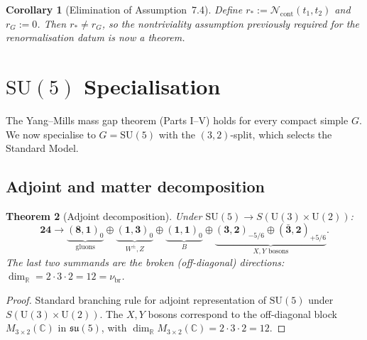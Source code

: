 \documentclass[12pt]{article}
\theoremstyle{plain}
\newtheorem{theorem}{Theorem}[section]
\newtheorem{corollary}[theorem]{Corollary}
\theoremstyle{definition}
\numberwithin{equation}{section}
\newcommand{\R}{\mathbb{R}}
\newcommand{\C}{\mathbb{C}}
\newcommand{\br}{\mathrm{br}}
\begin{document}
\begin{corollary}[Elimination of Assumption~7.4]\label{cor:elimination}
Define $r_*:=\mathcal{N}_{\mathrm{cont}}(t_1,t_2)$ and $r_G:=0$.  Then $r_*\neq r_G$, so the nontriviality assumption previously required for the renormalisation datum is now a theorem.
\end{corollary}

\section{$\mathrm{SU}(5)$ Specialisation}\label{sec:SU5}

The Yang--Mills mass gap theorem (Parts I--V) holds for every compact simple $G$.  We now specialise to $G=\mathrm{SU}(5)$ with the $(3,2)$-split, which selects the Standard Model.

\subsection{Adjoint and matter decomposition}

\begin{theorem}[Adjoint decomposition]
Under $\mathrm{SU}(5)\to S(\mathrm{U}(3)\times\mathrm{U}(2))$:
\begin{equation}
\mathbf{24}\to\underbrace{(\mathbf{8},\mathbf{1})_0}_{\text{gluons}}\oplus\underbrace{(\mathbf{1},\mathbf{3})_0}_{W^\pm,Z}\oplus\underbrace{(\mathbf{1},\mathbf{1})_0}_{B}\oplus\underbrace{(\mathbf{3},\mathbf{2})_{-5/6}\oplus(\bar{\mathbf{3}},\mathbf{2})_{+5/6}}_{X,Y\text{ bosons}}.
\end{equation}
The last two summands are the broken (off-diagonal) directions: $\dim_\R=2\cdot 3\cdot 2=12=\nu_{\br}$.
\end{theorem}

\begin{proof}
Standard branching rule for adjoint representation of $\mathrm{SU}(5)$ under $S(\mathrm{U}(3)\times\mathrm{U}(2))$.  The $X,Y$ bosons correspond to the off-diagonal block $M_{3\times 2}(\C)$ in $\mathfrak{su}(5)$, with $\dim_\R M_{3\times 2}(\C)=2\cdot 3\cdot 2=12$.
\end{proof}
\end{document}
